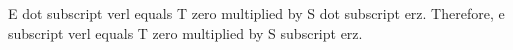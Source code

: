 E dot subscript verl equals T zero multiplied by S dot subscript erz.  
Therefore, e subscript verl equals T zero multiplied by S subscript erz.
